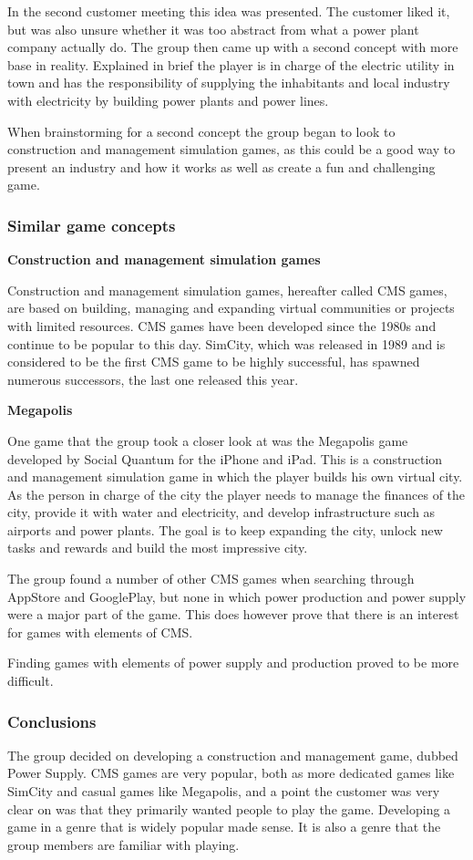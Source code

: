 In the second customer meeting this idea was presented. The customer liked it,
but was also unsure whether it was too abstract from what a power plant company
actually do. The group then came up with a second concept with more base in
reality. Explained in brief the player is in charge of the electric utility in
town and has the responsibility of supplying the inhabitants and local industry
with electricity by building power plants and power lines.

When brainstorming for a second concept the group began to look to construction
and management simulation games, as this could be a good way to present an
industry and how it works as well as create a fun and challenging game. 

\subsubsection{Similar game concepts}

{\bf Construction and management simulation games}

Construction and management simulation games, hereafter called CMS games, are
based on building, managing and expanding virtual communities or projects
with limited resources. CMS games have been developed since the 1980s and
continue to be popular to this day. SimCity, which was released in 1989 and
is considered to be the first CMS game to be highly successful, has spawned
numerous successors, the last one released this year.

{\bf Megapolis}

One game that the group took a closer look at was the Megapolis game developed
by Social Quantum for the iPhone and iPad. This is a construction and
management simulation game in which the player builds his own virtual city. As
the person in charge of the city the player needs to manage the finances of the
city, provide it with water and electricity, and develop infrastructure such as
airports and power plants. The goal is to keep expanding the city, unlock new
tasks and rewards and build the most impressive city.

The group found a number of other CMS games when searching through AppStore and
GooglePlay, but none in which power production and power supply were a major
part of the game. This does however prove that there is an interest for games
with elements of CMS.

Finding games with elements of power supply and production proved to be more
difficult.

\subsubsection{Conclusions}

The group decided on developing a construction and management game, dubbed Power Supply. CMS games are very popular, both as more dedicated games like SimCity and casual games like Megapolis, and a point the customer was very clear on was that they primarily wanted people to play the game. Developing a game in a genre that is widely popular made sense. It is also a genre that the group members are familiar with playing.
